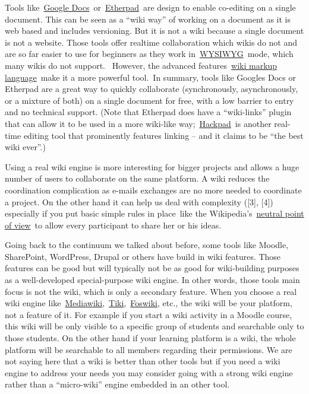 Tools like~\href{https://docs.google.com/}{Google
Docs}~or~\href{http://en.wikipedia.org/wiki/Etherpad}{Etherpad}~are
design to enable co-editing on a single document. This can be seen as a
``wiki way'' of working on a document as it is web based and includes
versioning. But it is not a wiki because a single document is not a
website. Those tools offer realtime collaboration which wikis do not and
are so far easier to use for beginners as they work
in~\href{http://en.wikipedia.org/wiki/WYSIWYG}{WYSIWYG}~mode, which many
wikis do not support. ~However, the advanced
features~\href{http://en.wikipedia.org/wiki/Wiki_syntax}{wiki markup
language}~make it a more powerful tool.~In summary, tools like Googles
Docs or Etherpad are a great way to quickly collaborate (synchronously,
asynchronously, or a mixture of both) on a single document for free,
with a low barrier to entry and no technical support. (Note that
Etherpad does have a ``wiki-links'' plugin that can allow it to be used
in a more wiki-like way;~\href{https://hackpad.com/}{Hackpad}~is another
real-time editing tool that prominently features linking -- and it
claims to be ``the best wiki ever''.)

Using a real wiki engine is more interesting for bigger projects and
allows a huge number of users to collaborate on the same platform. A
wiki reduces the coordination complication as e-mails exchanges are no
more needed to coordinate a project. On the other hand it can help us
deal with complexity ({{[}3{]}}, {{[}4{]}}) especially if you put basic
simple rules in place~like the
Wikipedia's~\href{http://en.wikipedia.org/wiki/NPOV}{neutral point of
view}~to allow every participant to share her or his ideas.

Going back to the continuum we talked about before, some tools like
Moodle, SharePoint, WordPress, Drupal or others have build in wiki
features. Those features can be good but will typically not be as good
for wiki-building purposes as a well-developed special-purpose wiki
engine. In other words, those tools main focus is not the wiki, which is
only a secondary feature. When you choose a real wiki engine
like~\href{http://www.mediawiki.org/}{Mediawiki},~\href{http://www.tiki.org/}{Tiki},~\href{http://foswiki.org/}{Foswiki},
etc., the wiki will be your platform, not a feature of it. For example
if you start a wiki activity in a Moodle course, this wiki will be only
visible to a specific group of students and searchable only to those
students. On the other hand if your learning platform is a wiki, the
whole platform will be searchable to all members regarding their
permissions. We are not saying here that a wiki is better than other
tools but if you need a wiki engine to address your needs you may
consider going with a strong wiki engine rather than a ``micro-wiki''
engine embedded in an other tool.


